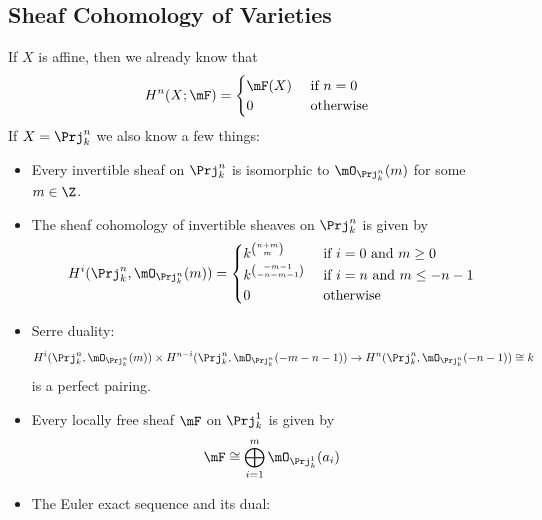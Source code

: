 \documentclass[a4paper]{article}
\begin{document}
\subsection{Sheaf Cohomology of Varieties}
If $X$ is affine, then we already know that $$H^n(X;\mF)=\begin{cases}
\mF(X) & \text{ if }n=0\\
0 & \text{ otherwise }
\end{cases}$$ If $X=\Prj_k^n$ we also know a few things: 
\begin{itemize}
\item Every invertible sheaf on $\Prj_k^n$ is isomorphic to $\mO_{\Prj_k^n}(m)$ for some $m\in\Z$. 
\item The sheaf cohomology of invertible sheaves on $\Prj_k^n$ is given by $$H^i(\Prj_k^n,\mO_{\Prj_k^n}(m))=\begin{cases}
k^{\binom{n+m}{m}} & \text{ if }i=0\text{ and }m\geq 0\\
k^{\binom{-m-1}{-n-m-1}} & \text{ if }i=n\text{ and }m\leq-n-1\\
0 & \text{ otherwise }
\end{cases}$$
\item Serre duality: $$H^i(\Prj_k^n,\mO_{\Prj_k^n}(m))\times H^{n-i}(\Prj_k^n,\mO_{\Prj_k^n}(-m-n-1))\to H^n(\Prj_k^n,\mO_{\Prj_k^n}(-n-1))\cong k$$ is a perfect pairing. 
\item Every locally free sheaf $\mF$ on $\Prj_k^1$ is given by $$\mF\cong\bigoplus_{i=1}^m\mO_{\Prj_k^1}(a_i)$$
\item The Euler exact sequence and its dual: \\
\\~\\
\end{itemize}
\end{document}
